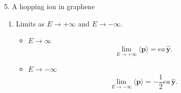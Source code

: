 \documentclass[11pt]{article}
\begin{document}
\begin{problem}{5. A hopping ion in graphene}
\begin{enumerate}[label=(\alph*)]
\begin{answer}
\begin{equation}
      \label{eq:21}
      \begin{aligned}
        \langle \mathbf{p} \rangle = \langle p_y \rangle \hat{\mathbf{y}} &= \frac{\left(-\frac{1}{2}ea\right) 2\exp\left(-\frac{eaE}{2\tau}\right) + (ea)\exp\left(\frac{eaE}{\tau}\right)}{2\exp\left(-\frac{eaE}{2\tau}\right) + \exp\left(\frac{eaE}{\tau}\right)} \hat{\mathbf{y}} \\[1.5ex]
        &= ea \left[ \frac{\exp\left(\frac{eaE}{\tau}\right) - \exp\left(-\frac{eaE}{2\tau}\right)}{\exp\left(\frac{eaE}{\tau}\right) + 2\exp\left(-\frac{eaE}{2\tau}\right)} \right] \hat{\mathbf{y}} = ea \left[ \frac{1 - \exp\left(-\frac{3eaE}{2\tau}\right)}{1 + 2\exp\left(-\frac{3eaE}{2\tau}\right)} \right] \hat{\mathbf{y}}.
      \end{aligned}
      \end{equation}
    \end{answer}
    \item Limits as \( E \rightarrow +\infty \) and \( E \rightarrow -\infty \).
    \begin{answer}\hfill
      \begin{itemize}
              \item \( E \rightarrow \infty \)
        \begin{equation}
          \lim_{E \to +\infty} \langle \mathbf{p} \rangle = ea\,\hat{\mathbf{y}}.
        \end{equation}
              \item \( E \rightarrow -\infty \)
        \begin{equation}
          \lim_{E \to -\infty} \langle \mathbf{p} \rangle = -\frac{1}{2}ea\,\hat{\mathbf{y}}.
        \end{equation}
      \end{itemize}
    \end{answer}
  \end{enumerate}
\end{problem}
\end{document}
